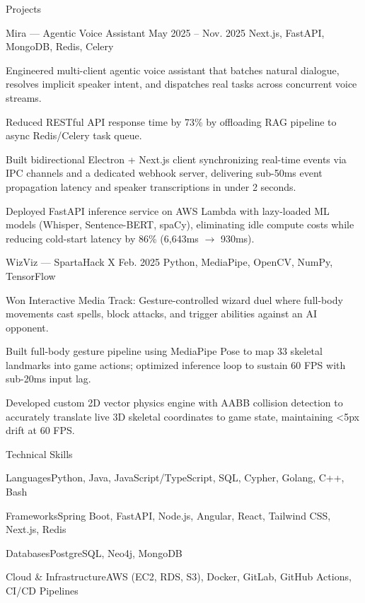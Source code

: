 \documentclass[
	11pt
]{../resume}
\begin{document}
	\begin{rSection}{P}{rojects}
		\begin{rSectionEntry}
			{Mira --- Agentic Voice Assistant}
			{May 2025 -- Nov. 2025}
			{}
			{Next.js, FastAPI, MongoDB, Redis, Celery}
			{}

			\item Engineered multi-client agentic voice assistant that batches natural dialogue, resolves implicit speaker intent, and dispatches real tasks across concurrent voice streams.
			\item Reduced RESTful API response time by 73\% by offloading RAG pipeline to async Redis/Celery task queue.
			\item Built bidirectional Electron + Next.js client synchronizing real-time events via IPC channels and a dedicated webhook server, delivering sub-50ms event propagation latency and speaker transcriptions in under 2 seconds.
			\item Deployed FastAPI inference service on AWS Lambda with lazy-loaded ML models (Whisper, Sentence-BERT, spaCy), eliminating idle compute costs while reducing cold-start latency by 86\% (6{,}643ms $\rightarrow$ 930ms).
		\end{rSectionEntry}

		\begin{rSectionEntry}
			{WizViz --- SpartaHack X}
			{Feb. 2025}
			{}
			{Python, MediaPipe, OpenCV, NumPy, TensorFlow}
			{}

			\item Won Interactive Media Track: Gesture-controlled wizard duel where full-body movements cast spells, block attacks, and trigger abilities against an AI opponent.
			\item Built full-body gesture pipeline using MediaPipe Pose to map 33 skeletal landmarks into game actions; optimized inference loop to sustain 60 FPS with sub-20ms input lag.
			\item Developed custom 2D vector physics engine with AABB collision detection to accurately translate live 3D skeletal coordinates to game state, maintaining \textless5px drift at 60 FPS.
		\end{rSectionEntry}
	\end{rSection}

	\begin{rSection}{T}{echnical Skills}
		\begin{rSet}{Languages}{Python, Java, JavaScript/TypeScript, SQL, Cypher, Golang, C++, Bash}
		\end{rSet}
		\begin{rSet}{Frameworks}{Spring Boot, FastAPI, Node.js, Angular, React, Tailwind CSS, Next.js, Redis}
		\end{rSet}
		\begin{rSet}{Databases}{PostgreSQL, Neo4j, MongoDB}
		\end{rSet}
		\begin{rSet}{Cloud \& Infrastructure}{AWS (EC2, RDS, S3), Docker, GitLab, GitHub Actions, CI/CD Pipelines}
		\end{rSet}
	\end{rSection}
\end{document}
